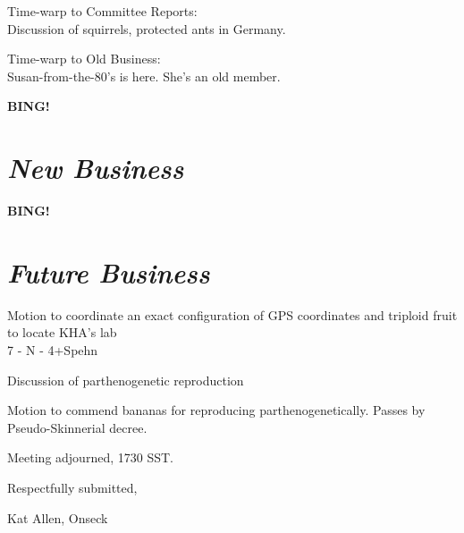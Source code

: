\documentclass[12pt]{article}
\newcommand{\bing}{{\bf BING!} }
\newcommand{\goto}[1]{\bing \vskip 12pt \section*{{\em{#1}}}}
\begin{document}
Time-warp to Committee Reports:\\
Discussion of squirrels, protected ants in Germany.

Time-warp to Old Business:\\
Susan-from-the-80's is here. She's an old member.

\goto{New Business}

\goto{Future Business}

Motion to coordinate an exact configuration of GPS coordinates and
triploid fruit to locate KHA's lab\\
7 - N - 4+Spehn

Discussion of parthenogenetic reproduction

Motion to commend bananas for reproducing parthenogenetically.
Passes by Pseudo-Skinnerial decree.

\vspace{12pt}

\noindent
Meeting adjourned, 1730 SST.

\vspace{18pt}

\centerline{Respectfully submitted,}
\centerline{Kat Allen,  Onseck}
\end{document}
